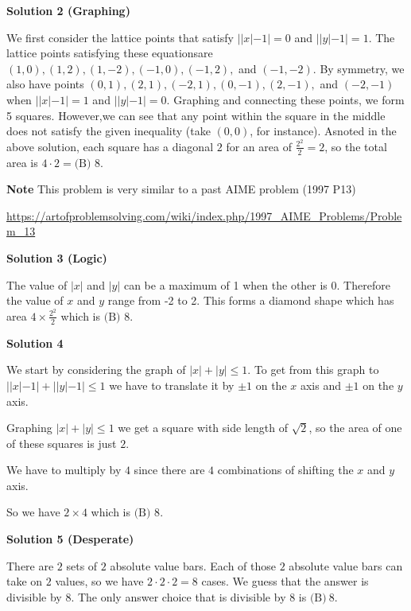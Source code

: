 \begin{enumerate}
\textbf{Solution 2 (Graphing)}

We first consider the lattice points that satisfy $||x|-1| = 0$ and $||y|-1| = 1$. The lattice points satisfying these equationsare $(1,0), (1,2), (1,-2), (-1,0), (-1,2),$ and $(-1,-2).$ By symmetry, we also have points $(0,1), (2,1), (-2,1), (0,-1), (2,-1),$ and  $(-2,-1)$  when  $||x|-1| = 1$ and $||y|-1| = 0$.  Graphing and connecting these points, we form 5 squares. However,we can see that any point within the square in the middle does not satisfy the given inequality (take $(0,0)$, for instance). Asnoted in the above solution, each square has a diagonal $2$ for an area of $\frac{2^2}{2} = 2$, so the total area is $4\cdot2 =$$\boxed{\text{(B) 8}}.$ 

 \textbf{Note} This problem is very similar to a past AIME problem (1997 P13)

 \href{https://artofproblemsolving.com/wiki/index.php/1997\_AIME\_Problems/Problem\_13}{https://artofproblemsolving.com/wiki/index.php/1997\_AIME\_Problems/Problem\_13}

 



\textbf{Solution 3 (Logic)}

The value of $|x|$ and $|y|$ can be a maximum of 1 when the other is 0. Therefore the value of $x$ and $y$ range from -2 to 2. This forms a diamond shape which has area $4 \times \frac{2^2}{2}$ which is $\boxed{\text{(B) 8}}.$




\textbf{Solution 4}

We start by considering the graph of $|x|+|y|\leq 1$. To get from this graph to $||x|-1|+||y|-1| \leq 1$ we have to translate it by $\pm 1$ on the $x$ axis and $\pm 1$ on the $y$ axis.

 Graphing $|x|+|y|\leq 1$ we get a square with side length of $\sqrt{2}$, so the area of one of these squares is just $2$.

 We have to multiply by $4$ since there are $4$ combinations of shifting the $x$ and $y$ axis.

 So we have $2\times 4$ which is $\boxed{\text{(B) 8}}$.

 



\textbf{Solution 5 (Desperate)}

There are $2$ sets of $2$ absolute value bars. Each of those $2$ absolute value bars can take on $2$ values, so we have $2 \cdot 2 \cdot 2 = 8$ cases. We guess that the answer is divisible by $8$. The only answer choice that is divisible by $8$ is $\boxed{\text{(B)}~8}$.


\end{enumerate}
